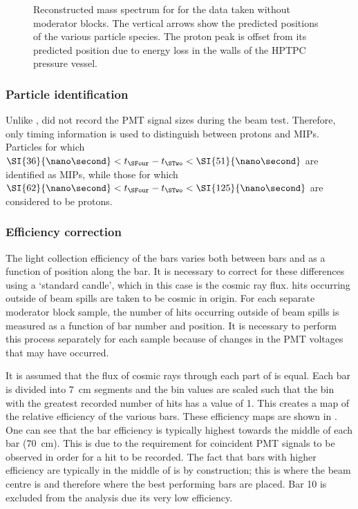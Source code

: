 \begin{figure}[h]
  \begin{adjustbox}{max totalsize=.9\textwidth, center}
    
  \end{adjustbox}
  \caption[Reconstructed mass spectrum for \SFour]{Reconstructed mass spectrum for \SFour for the data taken without moderator blocks. The vertical arrows show the predicted positions of the various particle species. The proton peak is offset from its predicted position due to energy loss in the walls of the HPTPC pressure vessel.}
  \label{fig:s4MassDistribution}
\end{figure}

\subsubsection{Particle identification}
\label{sec:hptpc_beam_flux:methods:s4:pid}

Unlike \SThree, \SFour did not record the PMT signal sizes during the beam test.
Therefore, only timing information is used to distinguish between protons and MIPs.
Particles for which $\SI{36}{\nano\second} < t_{\SFour} - t_{\STwo} < \SI{51}{\nano\second}$ are identified as MIPs, while those for which $\SI{62}{\nano\second} < t_{\SFour} - t_{\STwo} < \SI{125}{\nano\second}$ are considered to be protons.

\subsubsection{Efficiency correction}
\label{sec:hptpc_beam_flux:methods:s4:efficiency}

The light collection efficiency of the \SFour bars varies both between bars and as a function of position along the bar.
It is necessary to correct for these differences using a `standard candle', which in this case is the cosmic ray flux.
\SFour hits occurring outside of beam spills are taken to be cosmic in origin.
For each separate moderator block sample, the number of hits occurring outside of beam spills is measured as a function of bar number and position.
It is necessary to perform this process separately for each sample because of changes in the PMT voltages that may have occurred.

It is assumed that the flux of cosmic rays through each part of \SFour is equal.
Each \SFour bar is divided into \SI{7}{\centi\metre} segments and the bin values are scaled such that the bin with the greatest recorded number of hits has a value of 1.
This creates a map of the relative efficiency of the various \SFour bars.
These efficiency maps are shown in .
One can see that the bar efficiency is typically highest towards the middle of each bar (\SI{70}{\centi\metre}).
This is due to the requirement for coincident PMT signals to be observed in order for a hit to be recorded.
The fact that bars with higher efficiency are typically in the middle of \SFour is by construction; this is where the beam centre is and therefore where the best performing bars are placed.
Bar 10 is excluded from the analysis due its very low efficiency.

